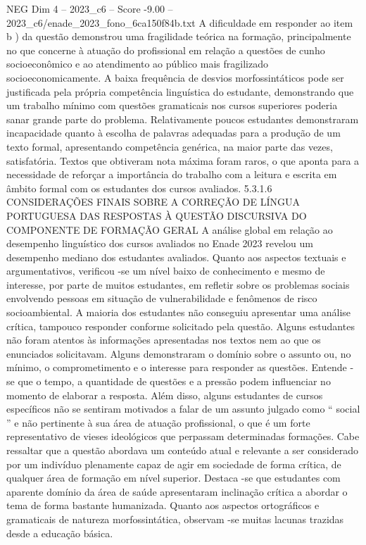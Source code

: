 \begin{textsample}{NEG Dim 4 – 2023\_c6 – Score -9.00 – 2023\_c6/enade\_2023\_fono\_6ca150f84b.txt}
A dificuldade em responder ao item b ) da questão demonstrou uma fragilidade teórica na formação, principalmente no que concerne à atuação do profissional em relação a questões de cunho socioeconômico e ao atendimento ao público mais fragilizado socioeconomicamente.
A baixa frequência de desvios morfossintáticos pode ser justificada pela própria competência linguística do estudante, demonstrando que um trabalho mínimo com questões gramaticais nos cursos superiores poderia sanar grande parte do problema.
Relativamente poucos estudantes demonstraram incapacidade quanto à escolha de palavras adequadas para a produção de um texto formal, apresentando competência genérica, na maior parte das vezes, satisfatória.
Textos que obtiveram nota máxima foram raros, o que aponta para a necessidade de reforçar a importância do trabalho com a leitura e escrita em âmbito formal com os estudantes dos cursos avaliados. 5.3.1.6 CONSIDERAÇÕES FINAIS SOBRE A CORREÇÃO DE LÍNGUA PORTUGUESA DAS RESPOSTAS À QUESTÃO DISCURSIVA DO COMPONENTE DE FORMAÇÃO GERAL A análise global em relação ao desempenho linguístico dos cursos avaliados no Enade 2023 revelou um desempenho mediano dos estudantes avaliados.
Quanto aos aspectos textuais e argumentativos, verificou -se um nível baixo de conhecimento e mesmo de interesse, por parte de muitos estudantes, em refletir sobre os problemas sociais envolvendo pessoas em situação de vulnerabilidade e fenômenos de risco socioambiental.
A maioria dos estudantes não conseguiu apresentar uma análise crítica, tampouco responder conforme solicitado pela questão.
Alguns estudantes não foram atentos às informações apresentadas nos textos nem ao que os enunciados solicitavam.
Alguns demonstraram o domínio sobre o assunto ou, no mínimo, o comprometimento e o interesse para responder as questões.
Entende -se que o tempo, a quantidade de questões e a pressão podem influenciar no momento de elaborar a resposta.
Além disso, alguns estudantes de cursos específicos não se sentiram motivados a falar de um assunto julgado como “ social ” e não pertinente à sua área de atuação profissional, o que é um forte representativo de vieses ideológicos que perpassam determinadas formações.
Cabe ressaltar que a questão abordava um conteúdo atual e relevante a ser considerado por um indivíduo plenamente capaz de agir em sociedade de forma crítica, de qualquer área de formação em nível superior.
Destaca -se que estudantes com aparente domínio da área de saúde apresentaram inclinação crítica a abordar o tema de forma bastante humanizada.
Quanto aos aspectos ortográficos e gramaticais de natureza morfossintática, observam -se muitas lacunas trazidas desde a educação básica.

\end{textsample}
